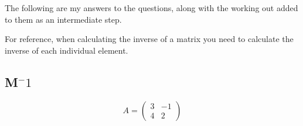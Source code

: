 \documentclass[a4paper,12pt]{article}
\begin{document}
      The following are my answers to the questions, along with the working out added to them as an intermediate step.

      For reference, when calculating the inverse of a matrix you need to calculate the inverse of each individual element.

      \subsection{M$^-1$}
      \begin{equation}
        A =
        \begin{pmatrix}
          3 & -1\\
          4 &  2
        \end{pmatrix}
      \end{equation}
\end{document}
